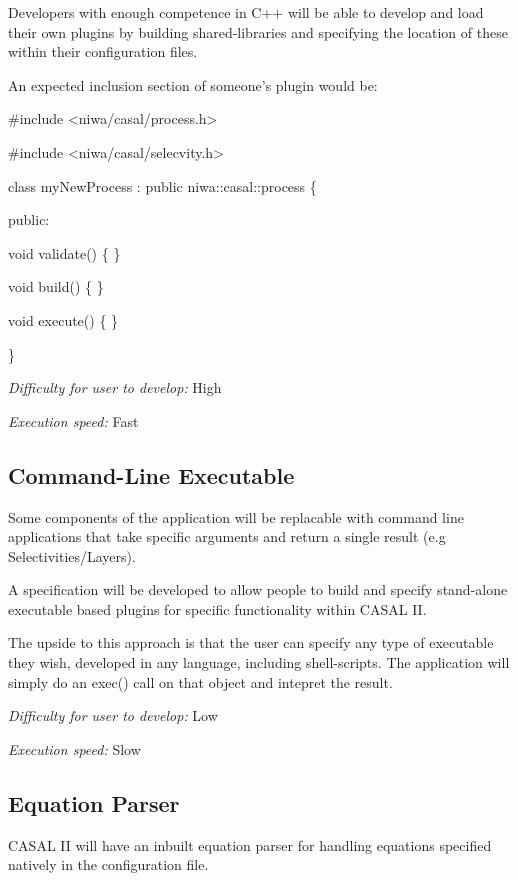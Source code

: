 \documentclass[a4paper,11pt,twoside,pdftex,draft]{article}
\begin{document}
Developers with enough competence in C++ will be able to develop and
load their own plugins by building shared-libraries and specifying the
location of these within their configuration files.

An expected inclusion section of someone's plugin would be:

\#include \textless niwa/casal/process.h\textgreater{}

\#include \textless niwa/casal/selecvity.h\textgreater{}

class myNewProcess : public niwa::casal::process \{

public:

void validate() \{ \}

void build() \{ \}

void execute() \{ \}

\}

\emph{Difficulty for user to develop:} High

\emph{Execution speed:} Fast

\hypertarget{command-line-executable}{%
\subsection{Command-Line Executable}\label{command-line-executable}}

Some components of the application will be replacable with command line
applications that take specific arguments and return a single result
(e.g Selectivities/Layers).

A specification will be developed to allow people to build and specify
stand-alone executable based plugins for specific functionality within
CASAL II.

The upside to this approach is that the user can specify any type of
executable they wish, developed in any language, including
shell-scripts. The application will simply do an exec() call on that
object and intepret the result.

\emph{Difficulty for user to develop:} Low

\emph{Execution speed:} Slow

\hypertarget{equation-parser-1}{%
\subsection{Equation Parser}\label{equation-parser-1}}

CASAL II will have an inbuilt equation parser for handling equations
specified natively in the configuration file.
\end{document}
